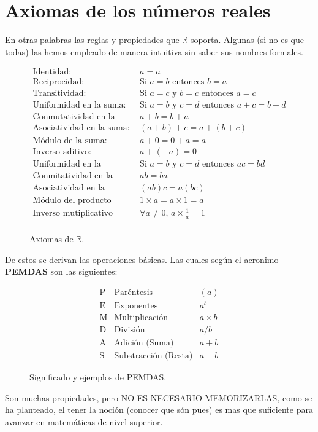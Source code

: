\documentclass[letterpaper, 12pt]{article}
\begin{document}
        \section{Axiomas de los números reales}
        En otras palabras las reglas y propiedades que \(\mathbb{R}\) soporta. Algunas (si no es que todas) las hemos empleado de manera intuitiva sin saber sus nombres formales.
        \begin{figure}[H]
            \[\begin{matrix}
                \text{Identidad:}&a=a\\
                \text{Reciprocidad:}&\text{Si }a=b \text{ entonces } b=a\\
                \text{Transitividad:}&\text{Si }a=c \text{ y }b=c \text{ entonces }a=c\\
                \text{Uniformidad en la suma:}&\text{Si }a=b \text{ y }c=d \text{ entonces }a+c=b+d\\
                \text{Conmutatividad en la suma:}&a+b=b+a\\
                \text{Asociatividad en la suma:}&(a+b)+c=a+(b+c)\\
                \text{Módulo de la suma:}&a+0=0+a=a\\
                \text{Inverso aditivo:}&a+(-a)=0\\
                \text{Uniformidad en la multiplicación:}&\text{Si }a=b \text{ y }c=d \text{ entonces }ac=bd\\
                \text{Conmitatividad en la multiplicación}&ab=ba\\
                \text{Asociatividad en la Multiplicación}&(ab)c=a(bc)\\
                \text{Módulo del producto}&1\times a=a\times 1=a\\
                \text{Inverso mutiplicativo}&\forall a\neq 0,\, a\times \frac{1}{a}=1\\
            \end{matrix}\]
            \caption{Axiomas de \(\mathbb{R}\).}
            \label{fig:axiomasR}
        \end{figure}
        De estos se derivan las operaciones básicas. Las cuales según el acronimo \textbf{PEMDAS} son las siguientes:
        \begin{figure}[H]
            \[\begin{matrix}
                \text{P}&\text{Paréntesis}&(a)\\
                \text{E}&\text{Exponentes}&a^b\\
                \text{M}&\text{Multiplicación}&a\times b\\
                \text{D}&\text{División}&a/b\\
                \text{A}&\text{Adición (Suma)}&a+b\\
                \text{S}&\text{Substracción (Resta)}&a-b
            \end{matrix}\]
            \caption{Significado y ejemplos de PEMDAS.}
            \label{fig:PEMDAS}
        \end{figure}
        Son muchas propiedades, pero NO ES NECESARIO MEMORIZARLAS, como se ha planteado, el tener la noción (conocer que són pues) es mas que suficiente para avanzar en matemáticas de nivel superior.
\end{document}
